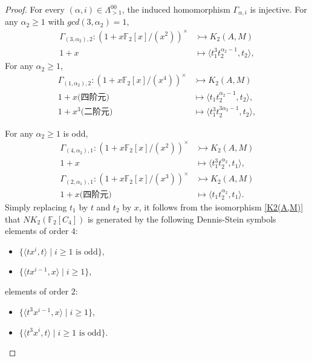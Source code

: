 \begin{proof}
For every $(\alpha,i)\in \Lambda^{00}_{>1}$, the induced homomorphism $\Gamma_{\alpha,i}$ is injective. For any $\alpha_2\geq 1$ with $gcd(3,\alpha_2)=1$, 
  \begin{align*}
 \Gamma_{(3,\alpha_2),2} \colon (1+x \mathbb{F}_2[x]/(x^{2}))^{\times} &\rightarrowtail K_2(A,M)\\
 1+x &\mapsto  \langle t_1^3t_2^{\alpha_2-1},t_2 \rangle,
 \end{align*}
For any $\alpha_2\geq 1$, 
  \begin{align*}
 \Gamma_{(1,\alpha_2),2} \colon (1+x \mathbb{F}_2[x]/(x^{4}))^{\times} &\rightarrowtail K_2(A,M)\\
 1+x \text{(四阶元)} &\mapsto \langle t_1t_2^{\alpha_2-1},t_2 \rangle,\\
 1+x^3 \text{(二阶元)} &\mapsto \langle t_1^3t_2^{3\alpha_2-1},t_2 \rangle,
 \end{align*}

For any $\alpha_2\geq 1$ is odd, 
 \begin{align*}
 \Gamma_{(4,\alpha_2),1} \colon (1+x \mathbb{F}_2[x]/(x^{2}))^{\times} &\rightarrowtail K_2(A,M)\\
 1+x &\mapsto \langle t_1^3t_2^{\alpha_2},t_1 \rangle,\\
 \Gamma_{(2,\alpha_1),1} \colon (1+x \mathbb{F}_2[x]/(x^{3}))^{\times} &\rightarrowtail K_2(A,M)\\
 1+x\text{(四阶元)} &\mapsto \langle t_1t_2^{\alpha_2},t_1 \rangle.
 \end{align*}
Simply replacing $t_1$ by $t$ and $t_2$ by $x$, it follows from the isomorphism \ref{K2(A,M)} that $NK_2(\mathbb{F}_2[C_4])$ is generated by the following Dennis-Stein symbols\\
elements of order $4$:
\begin{itemize}
 	\item $\{\langle tx^i,t \rangle \mid i\geq 1\text{ is odd}\},$
 	\item $\{\langle tx^{i-1},x \rangle \mid i\geq 1\}$,
 \end{itemize}
 elements of order $2$:
 \begin{itemize}
 	\item $\{\langle t^3x^{i-1},x \rangle \mid i\geq 1\}$, %
 	\item $\{\langle t^3x^i,t \rangle \mid i\geq 1\text{ is odd}\}$. \qedhere
 \end{itemize}
\end{proof}

